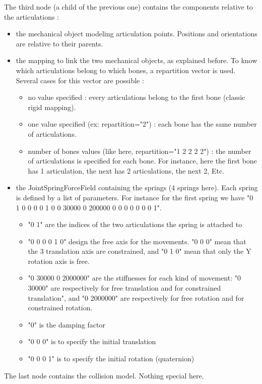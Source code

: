 The third node (a child of the previous one) contains the components relative to the articulations :
\begin{itemize}
	\item the mechanical object modeling articulation points. Positions and orientations are relative to their parents.
	\item the mapping to link the two mechanical objects, as explained before. To know which articulations belong to which bones, a repartition vector is used. Several cases for this vector are possible :
		\begin{itemize}
			\item no value specified : every articulations belong to the first bone (classic rigid mapping).
			\item one value specified (ex: repartition="2") : each bone has the same number of articulations.
			\item number of bones values (like here, repartition="1 2 2 2 2") : the number of articulations is specified for each bone. For instance, here the first bone has 1 articulation, the next has 2 articulations, the next 2, Etc.
		\end{itemize}
	\item the JointSpringForceField containing the springs (4 springs here). Each spring is defined by a list of parameters. For instance for the first spring we have "0 1   0 0 0 0 1 0   0 30000  0 200000   0  0 0 0  0 0 0 1".
		\begin{itemize}
			\item "0 1" are the indices of the two articulations the spring is attached to
			\item "0 0 0 0 1 0" design the free axis for the movements. "0 0 0" mean that the 3 translation axis are constrained, and "0 1 0" mean that only the Y rotation axis is free.
			\item "0 30000 0 2000000" are the stiffnesses for each kind of movement: "0 30000" are respectively for free translation and for constrained translation", and "0 2000000" are respectively for free rotation and for constrained rotation.
			\item "0" is the damping factor
			\item "0 0 0" is to specify the initial translation
			\item "0 0 0 1" is to specify the initial rotation (quaternion)
		\end{itemize}
\end{itemize}

The last node contains the collision model. Nothing special here.


